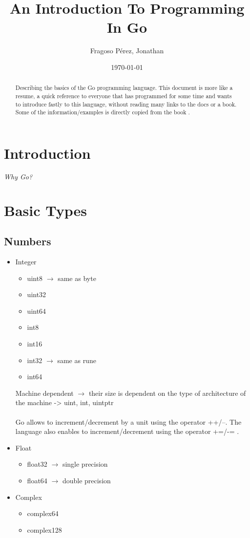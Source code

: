 \documentclass[twoside,a4paper,english]{report}
\title{An Introduction To Programming In Go}
\author{Fragoso Pérez, Jonathan}
\date{\today}
\begin{document}
\renewcommand{\abstractname}{Abstract}

\maketitle

\begin{abstract}
Describing the basics of the Go programming language. This document is more like a resume, a quick reference to everyone that has programmed for some time and wants to introduce fastly to this language, without reading many links to the docs or a book.
Some of the information/examples is directly copied from the book \cite{doxsey2012introduction}.
\end{abstract}


\newpage
\chapter{Introduction}
\emph{Why Go? } 

\chapter{Basic Types}
\section{Numbers}
\begin{itemize}
\item Integer
\begin{itemize}
\item uint8 $\rightarrow$ same as byte
\item uint32	
\item uint64
\item int8 
\item int16
\item int32 $\rightarrow$ same as rune
\item int64
\end{itemize}
Machine dependent $\rightarrow$ their size is dependent on the type of architecture of the machine -> uint, int, uintptr \\\\
Go allows to increment/decrement by a unit using the operator ++/--. The language also enables to increment/decrement using the operator +=/-= .
\item Float
\begin{itemize}
\item float32 $\rightarrow$ single precision
\item float64 $\rightarrow$ double precision
\end{itemize}
\item Complex
\begin{itemize}
\item complex64
\item complex128
\end{itemize}
\end{itemize}
\end{document}

